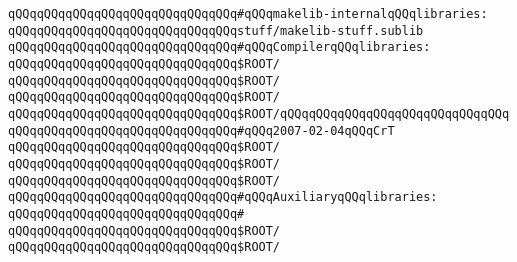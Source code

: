 \verb|qQQqqQQqqQQqqQQqqQQqqQQqqQQqqQQq#qQQqmakelib-internalqQQqlibraries:|\newline
\verb|qQQqqQQqqQQqqQQqqQQqqQQqqQQqqQQqstuff/makelib-stuff.sublib|\newline
\newline
\verb|qQQqqQQqqQQqqQQqqQQqqQQqqQQqqQQq#qQQqCompilerqQQqlibraries:|\newline
\verb|qQQqqQQqqQQqqQQqqQQqqQQqqQQqqQQq$ROOT/|\newline
\verb|qQQqqQQqqQQqqQQqqQQqqQQqqQQqqQQq$ROOT/|\newline
\verb|qQQqqQQqqQQqqQQqqQQqqQQqqQQqqQQq$ROOT/|\newline
\verb|qQQqqQQqqQQqqQQqqQQqqQQqqQQqqQQq$ROOT/|\verb|qQQqqQQqqQQqqQQqqQQqqQQqqQQqqQQqqQQqqQQqqQQqqQQqqQQqqQQqqQQqqQQq#qQQq2007-02-04qQQqCrT|\newline
\verb|qQQqqQQqqQQqqQQqqQQqqQQqqQQqqQQq$ROOT/|\newline
\verb|qQQqqQQqqQQqqQQqqQQqqQQqqQQqqQQq$ROOT/|\newline
\newline
\verb|qQQqqQQqqQQqqQQqqQQqqQQqqQQqqQQq$ROOT/|\newline
\newline
\verb|qQQqqQQqqQQqqQQqqQQqqQQqqQQqqQQq#qQQqAuxiliaryqQQqlibraries:|\newline
\verb|qQQqqQQqqQQqqQQqqQQqqQQqqQQqqQQq#|\newline
\verb|qQQqqQQqqQQqqQQqqQQqqQQqqQQqqQQq$ROOT/|\newline
\verb|qQQqqQQqqQQqqQQqqQQqqQQqqQQqqQQq$ROOT/|\newline


